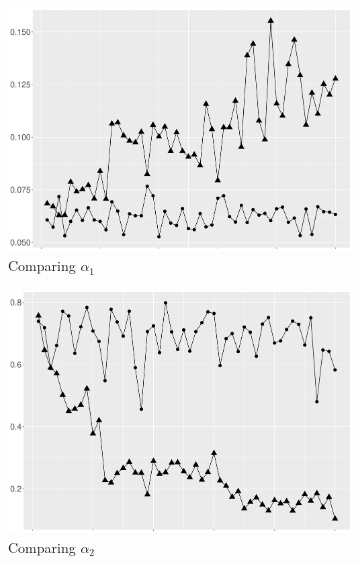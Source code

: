 \begin{figure}[ht]
\centering
\begin{subfigure}[t]{0.45\textwidth}
\includegraphics[width=\textwidth]{Chapters/05MCMCOU/plots/realdatacomparea1notupandup2.pdf}
   \caption{Comparing $\alpha_1$}
\end{subfigure}
\begin{subfigure}[t]{0.45\textwidth}
\includegraphics[width=\textwidth]{Chapters/05MCMCOU/plots/realdatacomparea2notupandup2.pdf}
   \caption{Comparing $\alpha_2$}
\end{subfigure}
\begin{subfigure}[t]{0.45\textwidth}

\end{subfigure}
\end{figure}
